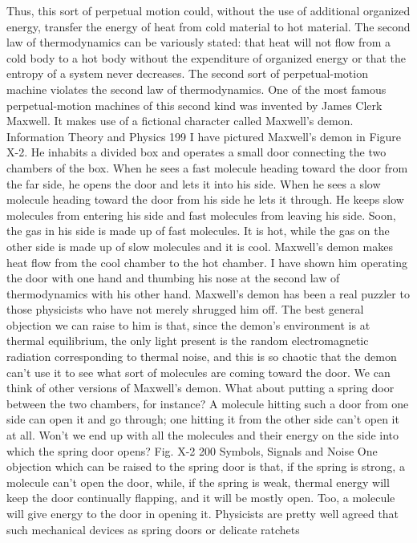 {{{{{{{{{{{Thus, this sort of perpetual motion could, without the use of
additional organized energy, transfer the energy of heat from cold
material to hot material.
The second law of thermodynamics can be variously stated: that
heat will not flow from a cold body to a hot body without the
expenditure of organized energy or that the entropy of a system
never decreases. The second sort of perpetual-motion machine
violates the second law of thermodynamics.
One of the most famous perpetual-motion machines of this
second kind was invented by James Clerk Maxwell. It makes use
of a fictional character called Maxwell’s demon.
Information Theory and Physics
199
I have pictured Maxwell’s demon in Figure X-2. He inhabits a
divided box and operates a small door connecting the two chambers
of the box. When he sees a fast molecule heading toward the
door from the far side, he opens the door and lets it into his side.
When he sees a slow molecule heading toward the door from his
side he lets it through. He keeps slow molecules from entering his
side and fast molecules from leaving his side. Soon, the gas in his
side is made up of fast molecules. It is hot, while the gas on the
other side is made up of slow molecules and it is cool. Maxwell’s
demon makes heat flow from the cool chamber to the hot chamber.
I have shown him operating the door with one hand and thumbing
his nose at the second law of thermodynamics with his other hand.
Maxwell’s demon has been a real puzzler to those physicists who
have not merely shrugged him off. The best general objection we
can raise to him is that, since the demon’s environment is at thermal
equilibrium, the only light present is the random electromagnetic
radiation corresponding to thermal noise, and this is so chaotic
that the demon can’t use it to see what sort of molecules are coming
toward the door.
We can think of other versions of Maxwell’s demon. What about
putting a spring door between the two chambers, for instance? A
molecule hitting such a door from one side can open it and go
through; one hitting it from the other side can’t open it at all.
Won’t we end up with all the molecules and their energy on the
side into which the spring door opens?
Fig. X-2
200 Symbols, Signals and Noise
One objection which can be raised to the spring door is that, if
the spring is strong, a molecule can’t open the door, while, if the
spring is weak, thermal energy will keep the door continually
flapping, and it will be mostly open. Too, a molecule will give
energy to the door in opening it. Physicists are pretty well agreed
that such mechanical devices as spring doors or delicate ratchets
}}}}}}}}}}}
